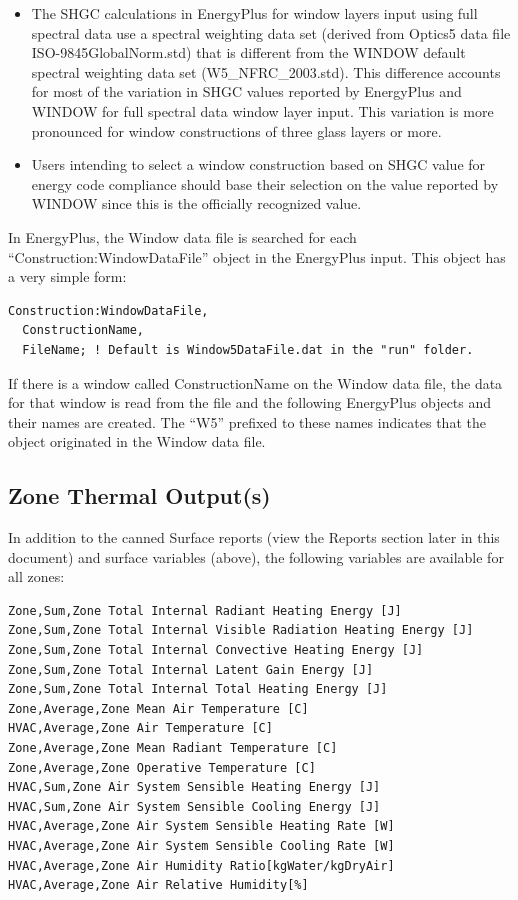 \begin{itemize}
\item
  The SHGC calculations in EnergyPlus for window layers input using full spectral data use a spectral weighting data set (derived from Optics5 data file ISO-9845GlobalNorm.std) that is different from the WINDOW default spectral weighting data set (W5\_NFRC\_2003.std). This difference accounts for most of the variation in SHGC values reported by EnergyPlus and WINDOW for full spectral data window layer input. This variation is more pronounced for window constructions of three glass layers or more.
\item
  Users intending to select a window construction based on SHGC value for energy code compliance should base their selection on the value reported by WINDOW since this is the officially recognized value.
\end{itemize}

In EnergyPlus, the Window data file is searched for each ``Construction:WindowDataFile'' object in the EnergyPlus input. This object has a very simple form:

\begin{lstlisting}
Construction:WindowDataFile,
  ConstructionName,
  FileName; ! Default is Window5DataFile.dat in the "run" folder.
\end{lstlisting}

If there is a window called ConstructionName on the Window data file, the data for that window is read from the file and the following EnergyPlus objects and their names are created. The ``W5'' prefixed to these names indicates that the object originated in the Window data file.

\subsection{Zone Thermal Output(s)}\label{zone-thermal-outputs-1}

In addition to the canned Surface reports (view the Reports section later in this document) and surface variables (above), the following variables are available for all zones:

\begin{lstlisting}
Zone,Sum,Zone Total Internal Radiant Heating Energy [J]
Zone,Sum,Zone Total Internal Visible Radiation Heating Energy [J]
Zone,Sum,Zone Total Internal Convective Heating Energy [J]
Zone,Sum,Zone Total Internal Latent Gain Energy [J]
Zone,Sum,Zone Total Internal Total Heating Energy [J]
Zone,Average,Zone Mean Air Temperature [C]
HVAC,Average,Zone Air Temperature [C]
Zone,Average,Zone Mean Radiant Temperature [C]
Zone,Average,Zone Operative Temperature [C]
HVAC,Sum,Zone Air System Sensible Heating Energy [J]
HVAC,Sum,Zone Air System Sensible Cooling Energy [J]
HVAC,Average,Zone Air System Sensible Heating Rate [W]
HVAC,Average,Zone Air System Sensible Cooling Rate [W]
HVAC,Average,Zone Air Humidity Ratio[kgWater/kgDryAir]
HVAC,Average,Zone Air Relative Humidity[%]
\end{lstlisting}

